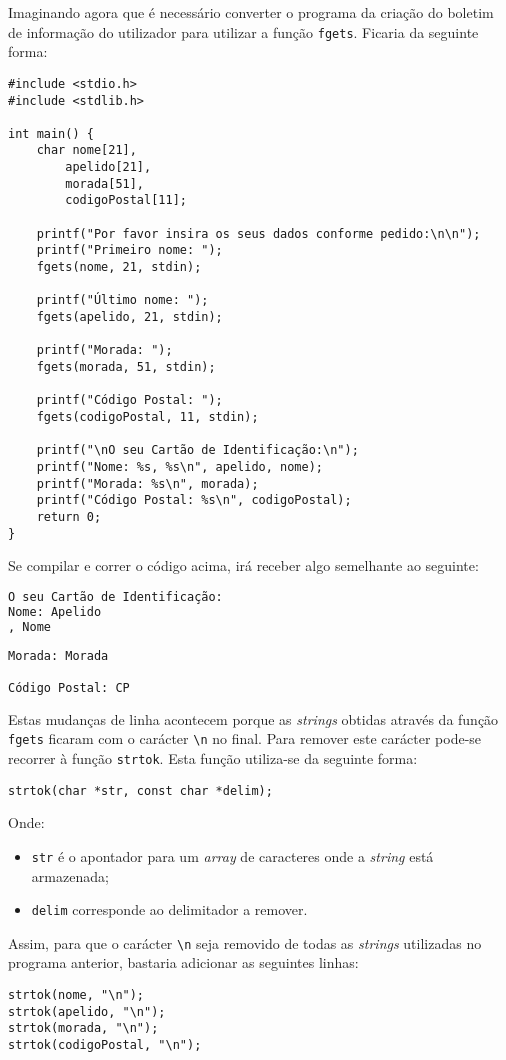 Imaginando agora que é necessário converter o programa da criação do boletim de informação do utilizador para utilizar a função \texttt{fgets}. Ficaria da seguinte forma:

\begin{lstlisting}
#include <stdio.h>
#include <stdlib.h>
 
int main() {
    char nome[21],
        apelido[21],
        morada[51],
        codigoPostal[11];
 
    printf("Por favor insira os seus dados conforme pedido:\n\n");
    printf("Primeiro nome: ");
    fgets(nome, 21, stdin);
 
    printf("Último nome: ");
    fgets(apelido, 21, stdin);
 
    printf("Morada: ");
    fgets(morada, 51, stdin);
 
    printf("Código Postal: ");
    fgets(codigoPostal, 11, stdin);
 
    printf("\nO seu Cartão de Identificação:\n");
    printf("Nome: %s, %s\n", apelido, nome);
    printf("Morada: %s\n", morada);
    printf("Código Postal: %s\n", codigoPostal);
    return 0;
}
\end{lstlisting}

Se compilar e correr o código acima, irá receber algo semelhante ao seguinte:

\begin{lstlisting}[language=bash,numbers=none]
O seu Cartão de Identificação:
Nome: Apelido
, Nome
 
Morada: Morada

Código Postal: CP
\end{lstlisting}

Estas mudanças de linha acontecem porque as \textit{strings} obtidas através da função \texttt{fgets} ficaram com o carácter \texttt{\textbackslash n} no final. Para remover este carácter pode-se recorrer à função \texttt{strtok}. Esta função utiliza-se da seguinte forma:

\begin{lstlisting}
strtok(char *str, const char *delim);
\end{lstlisting}

Onde:

\begin{itemize}
\item \texttt{str} é o apontador para um \textit{array} de caracteres onde a \textit{string} está armazenada;
\item \texttt{delim} corresponde ao delimitador a remover.
\end{itemize}

Assim, para que o carácter \texttt{\textbackslash n} seja removido de todas as \textit{strings} utilizadas no programa anterior, bastaria adicionar as seguintes linhas:

\begin{lstlisting}
strtok(nome, "\n");
strtok(apelido, "\n");
strtok(morada, "\n");
strtok(codigoPostal, "\n");
\end{lstlisting}
